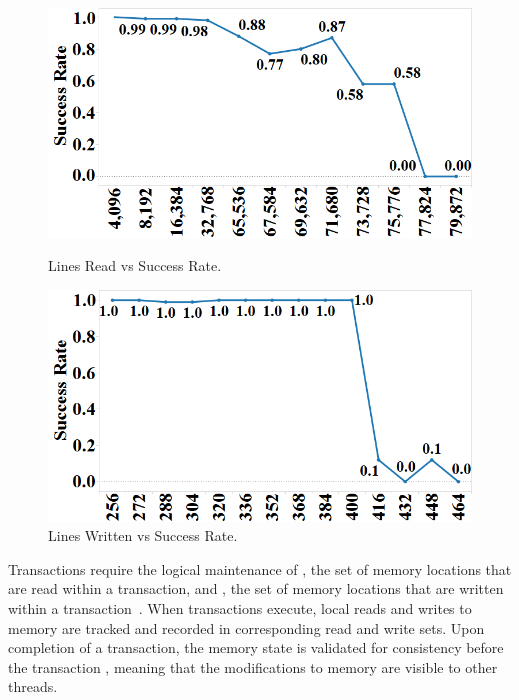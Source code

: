 \begin{figure}[h]%
\centering
\begin{minipage}[b]{.45\linewidth}
\centering
\includegraphics[width=\linewidth]{images/wttm_capacity_read_intel}
\caption{Lines Read vs Success Rate.}
\label{fig:wttm_capacity_read_intel}
\end{minipage}%
\quad
\begin{minipage}[b]{.45\linewidth}
\centering
\includegraphics[width=\linewidth]{images/wttm_capacity_write_intel}
\caption{Lines Written vs Success Rate.}
\label{fig:wttm_capacity_write_intel}
\end{minipage}
\end{figure}

Transactions require the logical 
maintenance of , the set
of memory locations that are read within a 
transaction, and , the set
of memory locations that are written within 
a transaction~\cite{HerlihyMo93}. When transactions execute, 
local reads and writes to memory 
are tracked and recorded in
corresponding read and write sets. Upon 
completion of a transaction, the memory state is validated for 
consistency before the transaction
, meaning that the modifications to 
memory are visible to other threads.



